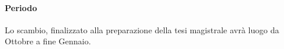 \documentclass[12pt, a4paper]{article}
\begin{document}
\paragraph{Periodo}
Lo scambio, finalizzato alla preparazione della tesi magistrale avrà luogo da Ottobre a fine Gennaio.




\end{document}
